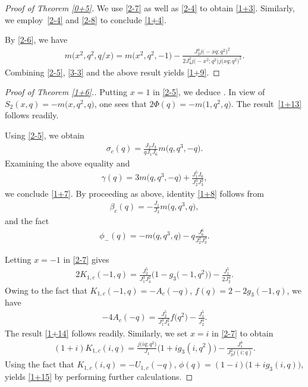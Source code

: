 \documentclass[pdftex]{sigma}
\numberwithin{equation}{section}
\begin{document}
\begin{proof}[Proof of Theorem \ref{0+5}]

We use \eqref{2-7} as well as \eqref{2-4} to obtain \eqref{1+3}. Similarly, we employ~\eqref{2-4} and \eqref{2-8} to conclude \eqref{1+4}.

By \eqref{2-6}, we have
\begin{align*}
m\bigl(x^2,q^2,q/x\bigr)=m\bigl(x^2,q^2,-1\bigr)
-\frac{J_2^4j\bigl(-xq;q^2\bigr)^2}{2J_4^2j\bigl(-x^2;q^2\bigr)j\bigl(xq;q^2\bigr)^2}.
\end{align*}
Combining \eqref{2-5}, \eqref{3-3} and the above result yields \eqref{1+9}.
\end{proof}

\begin{proof}[Proof of Theorem \ref{1+6}.] Putting $x=1$ in \eqref{2-5}, we deduce
.
In view of \cite[equation~(2.12)]{Mo1}
$
S_2(x,q)=-m\bigl(x,q^2,q\bigr)$,
one sees that
$
2\varPhi(q)=-m\bigl(1,q^2,q\bigr)$.
The result~\eqref{1+13} follows readily.

Using \eqref{2-5}, we obtain
\begin{align}\label{4-1}
\sigma_c(q)=\frac{J_2J_3}{qJ_1J_6}m\bigl(q,q^3,-q\bigr).
\end{align}
Examining the above equality and \cite[equation~(5.29)]{HM}
\begin{align*}
\gamma(q)=3m\bigl(q,q^3,-q\bigr)+\frac{J_1^5J_6}{J_2^3J_3^2},
\end{align*}
we conclude \eqref{1+7}. By proceeding as above, identity \eqref{1+8} follows from
\begin{align}\label{4-2}
\beta_c(q)=-\frac{J_1}{J_3}m\bigl(q,q^3,q\bigr),
\end{align}
and the fact \cite[equation~(5.30)]{HM}
\begin{align*}
\phi_-(q)=-m\bigl(q,q^3,q\bigr)-q\frac{J_6^6}{J_2^2J_3^3}.
\end{align*}

Letting $x=-1$ in \eqref{2-7} gives
\begin{align*}
2K_{1,c}(-1,q)=\frac{J_2^5}{J_1^3J_4^2}\bigl(1-g_3\bigl(-1,q^2\bigr)\bigr)-\frac{J_1^5}{2J_2^4}.
\end{align*}
Owing to the fact that
$
 K_{1,c}(-1,q)=-A_c(-q)$,
$f(q)= 2-2g_3(-1,q)$,
we have
\begin{align*}
-4A_c(-q)=\frac{J_2^5}{J_1^3J_4^2}f\bigl(q^2\bigr)-\frac{J_1^5}{J_2^4}.
\end{align*}
The result \eqref{1+14} follows readily. Similarly, we set $x=i$ in \eqref{2-7} to obtain
\begin{align*}
(1+i)K_{1,c}(i,q)=\frac{j\bigl(iq;q^2\bigr)}{J_1}\bigl(1+ig_3(i,q^2)\bigr)
-\frac{J_1^4}{J_2^2j(i;q)}.
\end{align*}
Using the fact that
$K_{1,c}(i,q)=-U_{1,c}(-q)$,
$\phi(q)= (1-i)\bigl(1+ig_3(i,q)\bigr)$,
yields \eqref{1+15} by performing further calculations.


\end{proof}
\end{document}
